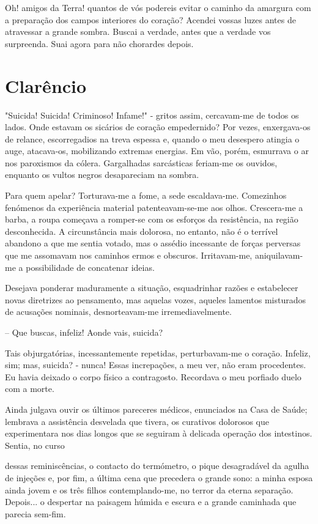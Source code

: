 \documentclass[portuguese,12pt,a4paper]{scrbook}
\begin{document}
	Oh! amigos da Terra! quantos de vós podereis evitar o caminho da amargura com a preparação dos campos interiores do coração? Acendei vossas luzes antes de atravessar a grande sombra. Buscai a verdade, antes que a verdade vos surpreenda. Suai agora para não chorardes depois.
	
	
	\chapter{Clarêncio}
	
	"Suicida! Suicida! Criminoso! Infame!" - gritos assim, cercavam-me de todos os lados. Onde estavam os sicários de coração empedernido? Por vezes, enxergava-os de relance, escorregadios na treva espessa e, quando o meu desespero atingia o auge, atacava-os, mobilizando extremas energias. Em vão, porém, esmurrava o ar nos paroxismos da cólera. Gargalhadas sarcásticas feriam-me os ouvidos, enquanto os vultos negros desapareciam na sombra.
	
	Para quem apelar? Torturava-me a fome, a sede escaldava-me. Comezinhos fenómenos da experiência material patenteavam-se-me aos olhos. Crescera-me a barba, a roupa começava a romper-se com os esforços da resistência, na região desconhecida. A circunstância mais dolorosa, no entanto, não é o terrível abandono a que me sentia votado, mas o assédio incessante de forças perversas que me assomavam nos caminhos ermos e obscuros. Irritavam-me, aniquilavam-me a possibilidade de concatenar ideias.
	
	Desejava ponderar maduramente a situação, esquadrinhar razões e estabelecer novas diretrizes ao pensamento, mas aquelas vozes, aqueles lamentos misturados de acusações nominais, desnorteavam-me irremediavelmente.
	
	– Que buscas, infeliz! Aonde vais, suicida?
	
	Tais objurgatórias, incessantemente repetidas, perturbavam-me o coração. Infeliz, sim; mas, suicida? - nunca! Essas increpações, a meu ver, não eram procedentes. Eu havia deixado o corpo físico a contragosto. Recordava o meu porfiado duelo com a morte.
	
	Ainda julgava ouvir os últimos pareceres médicos, enunciados na Casa de Saúde; lembrava a assistência desvelada que tivera, os curativos dolorosos que experimentara nos dias longos que se seguiram à delicada operação dos intestinos. Sentia, no curso
	
	
	dessas reminiscências, o contacto do termómetro, o pique desagradável da agulha de injeções e, por fim, a última cena que precedera o grande sono: a minha esposa ainda jovem e os três filhos contemplando-me, no terror da eterna separação. Depois... o despertar na paisagem húmida e escura e a grande caminhada que parecia sem-fim.
	
\end{document}
